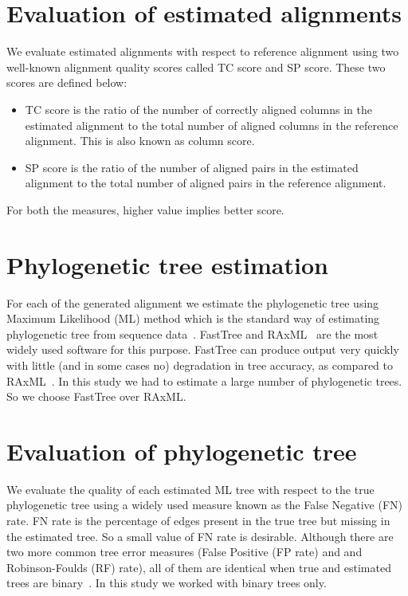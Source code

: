\section{Evaluation of estimated alignments}
\label{sec:msa_eval}
We evaluate estimated alignments with respect to reference alignment using two well-known alignment quality scores called TC score and SP score. These two scores are defined below:
\begin{itemize}
	\item TC score is the ratio of the number of correctly aligned columns in the estimated alignment to the total number of aligned columns in the reference alignment. This is also known as column score.
	
	\item SP score is the ratio of the number of aligned pairs in the estimated alignment to the total number of aligned pairs in the reference alignment.
	
\end{itemize}
For both the measures, higher value implies better score.

\section{Phylogenetic tree estimation}
\label{sec:tree_estimation}
For each of the generated alignment we estimate the phylogenetic tree using Maximum Likelihood (ML) method which is the standard way of estimating phylogenetic tree from sequence data~\cite{liu2011raxml}. FastTree\citep{price2010fasttree} and RAxML~\citep{stamatakis2014raxml} are the most widely used software for this purpose. FastTree can produce output very quickly with little (and in some cases no) degradation in tree accuracy, as compared to RAxML~\cite{liu2011raxml}. In this study we had to estimate a large number of phylogenetic trees. So we choose FastTree over RAxML.

\section{Evaluation of phylogenetic tree}
\label{sec:tree_eval}
We evaluate the quality of each estimated ML tree with respect to the true phylogenetic tree using a widely used measure known as the False Negative (FN) rate. FN rate is the percentage of edges present in the true tree but missing in the estimated tree. So a small value of FN rate is desirable. Although there are two more common tree error measures (False Positive (FP rate) and and Robinson-Foulds (RF) rate), all of them are identical when true and estimated trees are binary~\citep{warnow2017computational}. In this study we worked with binary trees only. %

